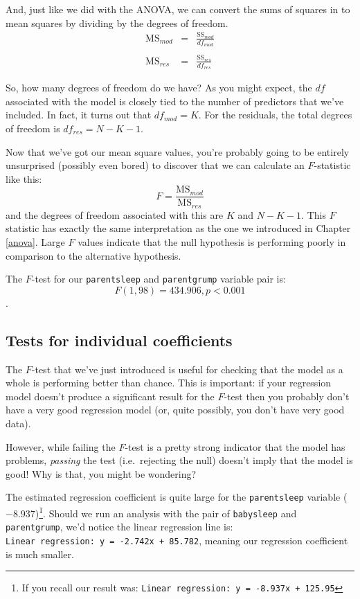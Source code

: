 \documentclass[
]{book}
\theoremstyle{definition}
\theoremstyle{definition}
\theoremstyle{definition}
\theoremstyle{definition}
\theoremstyle{remark}
\begin{document}
And, just like we did with the ANOVA, we can convert the sums of squares in to mean squares by dividing by the degrees of freedom.
\[
\begin{array}{rcl}
\mbox{MS}_{mod} &=& \displaystyle\frac{\mbox{SS}_{mod} }{df_{mod}} \\ \\
\mbox{MS}_{res} &=& \displaystyle\frac{\mbox{SS}_{res} }{df_{res} }
\end{array}
\]

So, how many degrees of freedom do we have? As you might expect, the \(df\) associated with the model is closely tied to the number of predictors that we've included. In fact, it turns out that \(df_{mod} = K\). For the residuals, the total degrees of freedom is \(df_{res} = N - K - 1\).

Now that we've got our mean square values, you're probably going to be entirely unsurprised (possibly even bored) to discover that we can calculate an \(F\)-statistic like this:
\[
F =  \frac{\mbox{MS}_{mod}}{\mbox{MS}_{res}}
\]
and the degrees of freedom associated with this are \(K\) and \(N-K-1\). This \(F\) statistic has exactly the same interpretation as the one we introduced in Chapter \ref{anova}. Large \(F\) values indicate that the null hypothesis is performing poorly in comparison to the alternative hypothesis.

The \(F\)-test for our \texttt{parentsleep} and \texttt{parentgrump} variable pair is:
\[
F(1, 98) = 434.906, p < 0.001
\].

\hypertarget{tests-for-individual-coefficients}{%
\subsection{Tests for individual coefficients}\label{tests-for-individual-coefficients}}

The \(F\)-test that we've just introduced is useful for checking that the model as a whole is performing better than chance. This is important: if your regression model doesn't produce a significant result for the \(F\)-test then you probably don't have a very good regression model (or, quite possibly, you don't have very good data).

However, while failing the \(F\)-test is a pretty strong indicator that the model has problems, \emph{passing} the test (i.e.~rejecting the null) doesn't imply that the model is good! Why is that, you might be wondering?

The estimated regression coefficient is quite large for the \texttt{parentsleep} variable (\(-8.937\))\footnote{If you recall our result was: \texttt{Linear\ regression:\ y\ =\ -8.937x\ +\ 125.95}}. Should we run an analysis with the pair of \texttt{babysleep} and \texttt{parentgrump}, we'd notice the linear regression line is: \texttt{Linear\ regression:\ y\ =\ -2.742x\ +\ 85.782}, meaning our regression coefficient is much smaller.
\end{document}
